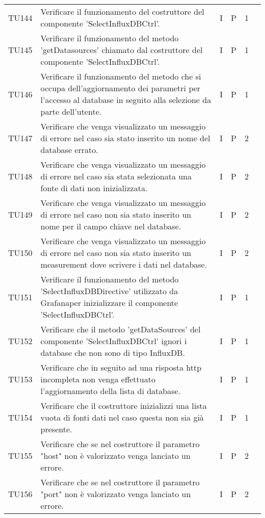 \begin{longtable} {
		>{}p{12mm}
		>{}p{79.5mm}
		>{}p{9mm}
		>{}p{8mm}
		>{}p{14mm}
		>{}p{0mm}}
	TU144		& Verificare il funzionamento del costruttore del componente 'SelectInfluxDBCtrl'. & I & P & 1 & \TBstrut \\ [2mm]
	TU145		& Verificare il funzionamento del metodo 'getDatasources' chiamato dal costruttore del componente 'SelectInfluxDBCtrl'. & I & P & 1 & \TBstrut \\ [2mm]
	TU146		& Verificare il funzionamento del metodo che si occupa dell'aggiornamento dei parametri per l'accesso al database in seguito alla selezione da parte dell'utente. & I & P & 1 & \TBstrut \\ [2mm]
	TU147		& Verificare che venga visualizzato un messaggio di errore nel caso sia stato inserito un nome del database errato. & I & P & 2 & \TBstrut \\ [2mm]
	TU148		& Verificare che venga visualizzato un messaggio di errore nel caso sia stata selezionata una fonte di dati non inizializzata. & I & P & 2 & \TBstrut \\ [2mm]
	TU149		& Verificare che venga visualizzato un messaggio di errore nel caso non sia stato inserito un nome per il campo chiave nel database. & I & P & 2 & \TBstrut \\ [2mm]
	TU150		& Verificare che venga visualizzato un messaggio di errore nel caso non sia stato inserito un measurement dove scrivere i dati nel database. & I & P & 2 & \TBstrut \\ [2mm]
	TU151		& Verificare il funzionamento del metodo 'SelectInfluxDBDirective' utilizzato da Grafana\glosp per inizializzare il componente 'SelectInfluxDBCtrl'. & I & P & 1 & \TBstrut \\ [2mm]
	TU152		& Verificare che il metodo 'getDataSources' del componente 'SelectInfluxDBCtrl' ignori i database che non sono di tipo InfluxDB. & I & P & 1 & \TBstrut \\ [2mm]
	TU153		& Verificare che in seguito ad una risposta http incompleta non venga effettuato l'aggiornamento della lista di database. & I & P & 1 & \TBstrut \\ [2mm]
	TU154		& Verificare che il costruttore inizializzi una lista vuota di fonti dati nel caso questa non sia già presente. & I & P & 1 & \TBstrut \\ [2mm]
	TU155		& Verificare che se nel costruttore il parametro "host" non è valorizzato venga lanciato un errore. & I & P & 2 & \TBstrut \\ [2mm]
	TU156		& Verificare che se nel costruttore il parametro "port" non è valorizzato venga lanciato un errore. & I & P & 2 & \TBstrut \\ [2mm]

\end{longtable}
